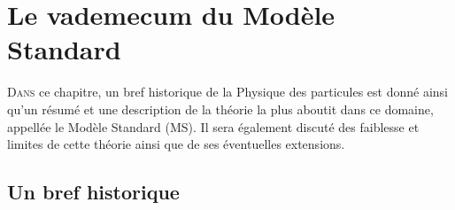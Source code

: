 \chapter{ Le vademecum du Modèle Standard }
\renewcommand\chapterillustration{SM/sm2}
\ThisULCornerWallPaper{1}{\chapterillustration}
\minitoc
\vspace{1cm}

\lettrine[lines=4, slope=-0.5em]{D}{ans} ce chapitre, un bref historique de la Physique des particules est donné ainsi qu'un résumé et une description de la théorie la plus aboutit dans ce domaine, appellée le Modèle Standard (MS). Il sera également discuté des faiblesse et limites de cette théorie ainsi que de ses éventuelles extensions.

\section{Un bref historique}

